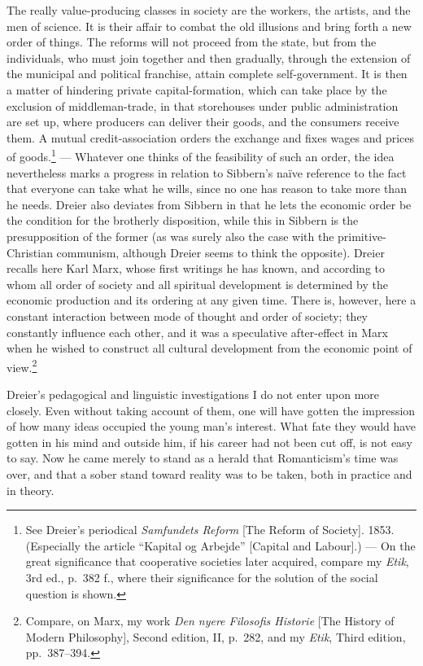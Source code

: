\documentclass[12pt,a4paper]{book}
\newcommand{\opage}[1]{\marginnote{\footnotesize\textit{[#1]}}}
\begin{document}
\opage{182}The really value-producing classes in society are the workers, the artists, and the men of
science. It is their affair to combat the old illusions and bring forth a new order of things.
The reforms will not proceed from the state, but from the individuals, who must join together
and then gradually, through the extension of the municipal and political franchise, attain
complete self-government. It is then a matter of hindering private capital-formation, which can
take place by the exclusion of middleman-trade, in that storehouses under public administration
are set up, where producers can deliver their goods, and the consumers receive them. A mutual
credit-association orders the exchange and fixes wages and prices of goods.\footnote{See
Dreier's periodical \emph{Samfundets Reform} [The Reform of Society]. 1853. (Especially the
article ``Kapital og Arbejde'' [Capital and Labour].) --- On the great significance that
cooperative societies later acquired, compare my \emph{Etik}, 3rd ed., p.~382 f., where their
significance for the solution of the social question is shown.} --- Whatever one thinks of the
feasibility of such an order, the idea nevertheless marks a progress in relation to Sibbern's
naïve reference to the fact that everyone can take what he wills, since no one has reason to
take more than he needs. Dreier also deviates from Sibbern in that he lets the economic order
be the condition for the brotherly disposition, while this in Sibbern is the presupposition of
the former (as was surely also the case with the primitive-Christian communism, although Dreier
seems to think the opposite). Dreier recalls here Karl Marx, whose first writings he has known,
and according to whom all order of society and all spiritual development is determined by the
economic production and its ordering at any given time. There is, however, here a constant
interaction between mode of thought and order of society; they constantly influence each other,
and it was a speculative after-effect in Marx when he wished to construct all cultural
development from the economic point of view.\footnote{Compare, on Marx, my work \emph{Den nyere
Filosofis Historie} [The History of Modern Philosophy], Second edition, II, p.~282, and my
\emph{Etik}, Third edition, pp.~387--394.}

Dreier's pedagogical and linguistic investigations I do not enter upon more closely. Even
without taking account \opage{183}of them, one will have gotten the impression of how many ideas occupied
the young man's interest. What fate they would have gotten in his mind and outside him, if his
career had not been cut off, is not easy to say. Now he came merely to stand as a herald that
Romanticism's time was over, and that a sober stand toward reality was to be taken, both in
practice and in theory.
\end{document}
